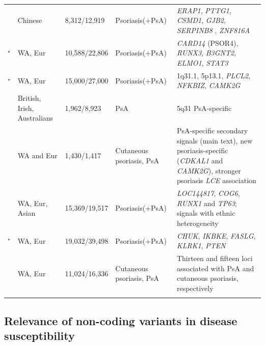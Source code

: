 \begin{landscape}
\begin{center}
\begin{longtable}[ht]{p{.25\textheight} p{.25\textheight} p{.20\textheight} p{.20\textheight} p{.50\textheight}}
\parencite{Sun2010} & Chinese	& 8,312/12,919	& Psoriasis(+PsA) &	\textit{ERAP1}, \textit{PTTG1}, \textit{CSMD1}, \textit{GJB2}, \textit{SERPINB8} , \textit{ZNF816A} \\

\parencite{Tsoi2012}$^\star$ & WA, Eur & 10,588/22,806 & Psoriasis(+PsA) & \textit{CARD14} (PSOR4), \textit{RUNX3}, \textit{B3GNT2}, \textit{ELMO1}, \textit{STAT3} \\

\parencite{Tsoi2015a}$^\star$	& WA, Eur	& 15,000/27,000	& Psoriasis(+PsA)	& 1q31.1, 5p13.1, \textit{PLCL2}, \textit{NFKBIZ}, \textit{CAMK2G} \\

\parencite{Bowes2015} &	British, Irish, Australians	& 1,962/8,923	& PsA	& 5q31 PsA-specific \\

\parencite{Stuart2015} &	WA and Eur	& 1,430/1,417	& Cutaneous psoriasis, PsA	& PsA-specific secondary signals (main text), new psoriasis-specific (\textit{CDKAL1} and \textit{CAMK2G}), stronger psoriasis \textit{LCE} association\\

\parencite{Yin2015} &	WA, Eur, Asian	&  15,369/19,517 & Psoriasis(+PsA)	& \textit{LOC144817}, \textit{COG6}, \textit{RUNX1} and \textit{TP63}; signals with ethnic heterogeneity \\

\parencite{Tsoi2017}$^\star$ &	WA, Eur	& 19,032/39,498	& Psoriasis(+PsA)	& \textit{CHUK}, \textit{IKBKE}, \textit{FASLG}, \textit{KLRK1}, \textit{PTEN} \\	

\parencite{Patrick2018} &	WA, Eur	& 11,024/16,336	& Cutaneous psoriasis, PsA	& Thirteen and fifteen loci associated with PsA and cutaneous psoriasis, respectively \\																		
\bottomrule
\medskip
\end{longtable}
\end{center}
\end{landscape}




\subsection{Relevance of non-coding variants in disease susceptibility}

